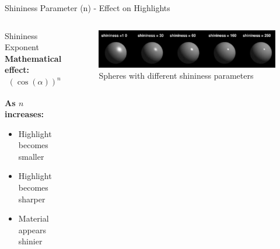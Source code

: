 \begin{frame}{Shininess Parameter (n) - Effect on Highlights}
  \begin{columns}
    \begin{column}{0.5\textwidth}
      \begin{mathbox}{Shininess Exponent}
        \small
        \textbf{Mathematical effect:}
        \begin{align*}
          (\cos(\alpha))^n
        \end{align*}

        \textbf{As $n$ increases:}
        \begin{itemize}
          \item Highlight becomes smaller
          \item Highlight becomes sharper
          \item Material appears shinier
        \end{itemize}
      \end{mathbox}
    \end{column}
    \begin{column}{0.5\textwidth}
      \begin{figure}
        \includegraphics[width=\linewidth]{images/shininess.png}
        \caption*{\scriptsize Spheres with different shininess parameters}
      \end{figure}
      \vspace{0.3cm}
    \end{column}
  \end{columns}
\end{frame}

